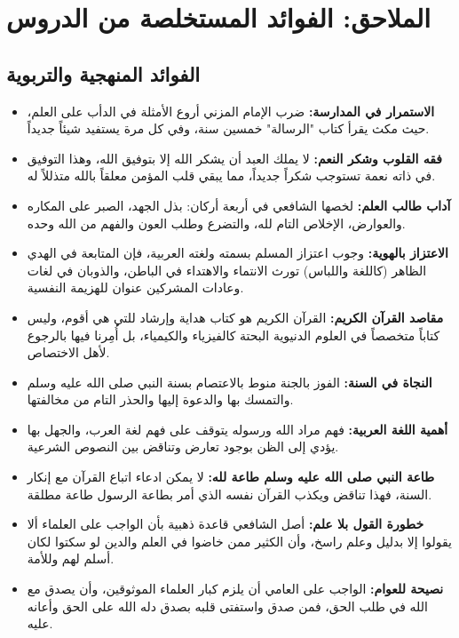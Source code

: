 \chapter{الملاحق: الفوائد المستخلصة من الدروس}

\section{الفوائد المنهجية والتربوية}
\begin{itemize}
    \item \textbf{الاستمرار في المدارسة:} ضرب الإمام المزني أروع الأمثلة في الدأب على العلم، حيث مكث يقرأ كتاب "الرسالة" خمسين سنة، وفي كل مرة يستفيد شيئاً جديداً.
    \item \textbf{فقه القلوب وشكر النعم:} لا يملك العبد أن يشكر الله إلا بتوفيق الله، وهذا التوفيق في ذاته نعمة تستوجب شكراً جديداً، مما يبقي قلب المؤمن معلقاً بالله متذللاً له.
    \item \textbf{آداب طالب العلم:} لخصها الشافعي في أربعة أركان: بذل الجهد، الصبر على المكاره والعوارض، الإخلاص التام لله، والتضرع وطلب العون والفهم من الله وحده.
    \item \textbf{الاعتزاز بالهوية:} وجوب اعتزاز المسلم بسمته ولغته العربية، فإن المتابعة في الهدي الظاهر (كاللغة واللباس) تورث الانتماء والاهتداء في الباطن، والذوبان في لغات وعادات المشركين عنوان للهزيمة النفسية.
    \item \textbf{مقاصد القرآن الكريم:} القرآن الكريم هو كتاب هداية وإرشاد للتي هي أقوم، وليس كتاباً متخصصاً في العلوم الدنيوية البحتة كالفيزياء والكيمياء، بل أُمِرنا فيها بالرجوع لأهل الاختصاص.
    \item \textbf{النجاة في السنة:} الفوز بالجنة منوط بالاعتصام بسنة النبي صلى الله عليه وسلم والتمسك بها والدعوة إليها والحذر التام من مخالفتها.
    \item \textbf{أهمية اللغة العربية:} فهم مراد الله ورسوله يتوقف على فهم لغة العرب، والجهل بها يؤدي إلى الظن بوجود تعارض وتناقض بين النصوص الشرعية.
    \item \textbf{طاعة النبي صلى الله عليه وسلم طاعة لله:} لا يمكن ادعاء اتباع القرآن مع إنكار السنة، فهذا تناقض ويكذب القرآن نفسه الذي أمر بطاعة الرسول طاعة مطلقة.
    \item \textbf{خطورة القول بلا علم:} أصل الشافعي قاعدة ذهبية بأن الواجب على العلماء ألا يقولوا إلا بدليل وعلم راسخ، وأن الكثير ممن خاضوا في العلم والدين لو سكتوا لكان أسلم لهم وللأمة.
    \item \textbf{نصيحة للعوام:} الواجب على العامي أن يلزم كبار العلماء الموثوقين، وأن يصدق مع الله في طلب الحق، فمن صدق واستفتى قلبه بصدق دله الله على الحق وأعانه عليه.

\end{itemize}

